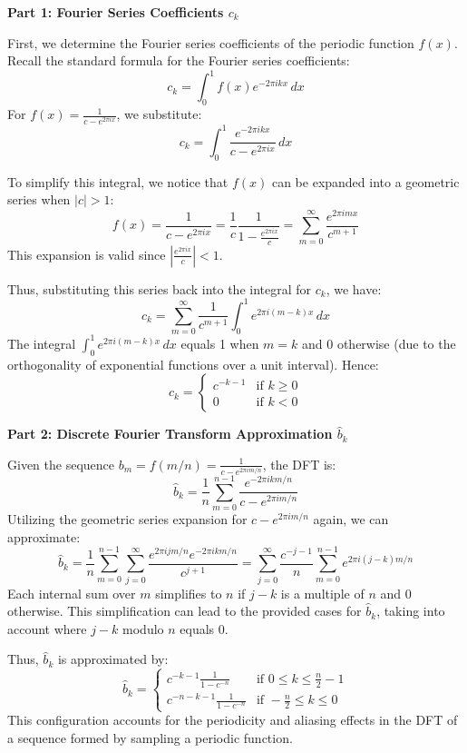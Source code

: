 \documentclass[8pt]{article}
\begin{document}
\textbf{Part 1: Fourier Series Coefficients \(c_k\)}

First, we determine the Fourier series coefficients of the periodic function \(f(x)\). Recall the standard formula for the Fourier series coefficients:
\[
c_k = \int_0^1 f(x) e^{-2\pi i k x} \, dx
\]
For \(f(x) = \frac{1}{c - e^{2\pi ix}}\), we substitute:
\[
c_k = \int_0^1 \frac{e^{-2\pi i k x}}{c - e^{2\pi ix}} \, dx
\]

To simplify this integral, we notice that \(f(x)\) can be expanded into a geometric series when \(|c| > 1\):
\[
f(x) = \frac{1}{c - e^{2\pi ix}} = \frac{1}{c} \frac{1}{1 - \frac{e^{2\pi ix}}{c}} = \sum_{m=0}^\infty \frac{e^{2\pi i mx}}{c^{m+1}}
\]
This expansion is valid since \( \left|\frac{e^{2\pi ix}}{c}\right| < 1 \).

Thus, substituting this series back into the integral for \(c_k\), we have:
\[
c_k = \sum_{m=0}^\infty \frac{1}{c^{m+1}} \int_0^1 e^{2\pi i (m-k) x} \, dx
\]
The integral \(\int_0^1 e^{2\pi i (m-k) x} \, dx\) equals 1 when \(m = k\) and 0 otherwise (due to the orthogonality of exponential functions over a unit interval). Hence:
\[
c_k = \begin{cases}
c^{-k-1} & \text{if } k \geq 0 \\
0 & \text{if } k < 0
\end{cases}
\]

\textbf{Part 2: Discrete Fourier Transform Approximation \(\hat{b}_k\)}

Given the sequence \(b_m = f(m/n) = \frac{1}{c - e^{2\pi i m/n}}\), the DFT is:
\[
\hat{b}_k = \frac{1}{n} \sum_{m=0}^{n-1} \frac{e^{-2\pi i k m/n}}{c - e^{2\pi i m/n}}
\]
Utilizing the geometric series expansion for \(c - e^{2\pi i m/n}\) again, we can approximate:
\[
\hat{b}_k = \frac{1}{n} \sum_{m=0}^{n-1} \sum_{j=0}^\infty \frac{e^{2\pi i j m/n} e^{-2\pi i k m/n}}{c^{j+1}} = \sum_{j=0}^\infty \frac{c^{-j-1}}{n} \sum_{m=0}^{n-1} e^{2\pi i (j-k) m/n}
\]
Each internal sum over \(m\) simplifies to \(n\) if \(j-k\) is a multiple of \(n\) and 0 otherwise. This simplification can lead to the provided cases for \(\hat{b}_k\), taking into account where \(j-k\) modulo \(n\) equals 0.

Thus, \(\hat{b}_k\) is approximated by:
\[
\hat{b}_k = \begin{cases}
c^{-k-1} \frac{1}{1 - c^{-n}} & \text{if } 0 \leq k \leq \frac{n}{2} - 1 \\
c^{-n-k-1} \frac{1}{1 - c^{-n}} & \text{if } -\frac{n}{2} \leq k \leq 0
\end{cases}
\]
This configuration accounts for the periodicity and aliasing effects in the DFT of a sequence formed by sampling a periodic function.
\end{document}
